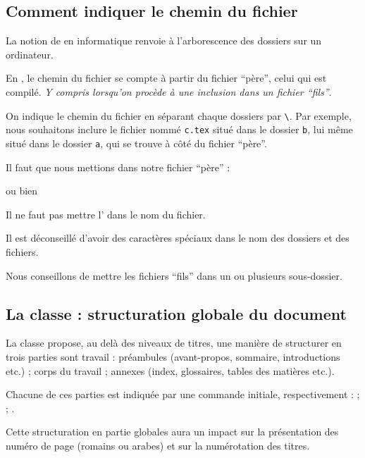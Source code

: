 \subsection{Comment indiquer le chemin du fichier}

La notion de  en informatique renvoie à l'arborescence des dossiers sur un ordinateur.

En \logiciel{\LaTeX}, le chemin du fichier se compte à partir du fichier \enquote{père}, celui qui est compilé. \emph{Y compris lorsqu'on procède à une inclusion dans un fichier \enquote{fils}}.

On indique le chemin du fichier en séparant chaque dossiers par \verb|\|.  Par exemple, nous souhaitons inclure le fichier nommé \verb|c.tex| situé dans le dossier \verb|b|, lui même situé dans le dossier \verb|a|, qui se trouve à côté du fichier \enquote{père}.

Il faut que nous mettions dans notre fichier \enquote{père} :

\verb||

ou bien

\verb||

\begin{attention}

Il ne faut pas mettre l'  dans le nom du fichier.

Il est déconseillé d'avoir des caractères spéciaux dans le nom des dossiers et des fichiers.
\end{attention}

Nous conseillons de mettre les fichiers \enquote{fils} dans un ou plusieurs sous-dossier.

\subsection{La classe  : structuration globale du document}

La classe  propose, au delà des niveaux de titres, une manière de structurer en trois parties sont travail : préambules (avant-propos, sommaire, introductions etc.) ; corps du travail ; annexes (index, glossaires, tables des matières etc.). 

Chacune de ces parties est indiquée par une commande initiale, respectivement : \commande{\frontmatter} ; \commande{\mainmatter} ; \commande{\backmatter}.

Cette structuration en partie globales aura un impact sur la présentation des numéro de page (romains ou arabes) et sur la numérotation des titres. 
